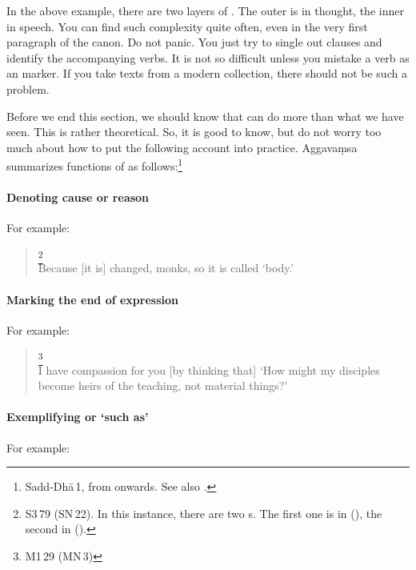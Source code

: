 In the above example, there are two layers of . The outer is in thought, the inner in speech. You can find such complexity quite often, even in the very first paragraph of the canon. Do not panic. You just try to single out  clauses and identify the accompanying verbs. It is not so difficult unless you mistake a verb as an  marker. If you take texts from a modern collection, there should not be such a problem.

Before we end this section, we should know that  can do more than what we have seen. This is rather theoretical. So, it is good to know, but do not worry too much about how to put the following account into practice. Aggava\d msa summarizes functions of  as follows:\footnote{Sadd-Dh\=a\,1, from  onwards. See also \citealp[p.~142]{collins:grammar}.}

\paragraph*{Denoting cause or reason}\label{par:iti} For example:

\begin{quote}
\footnote{S3\,79 (SN\,22). In this instance, there are two s. The first one is in  (), the second in  ().}\\
Because [it is] changed, monks, so it is called `body.'\\
\end{quote}

\paragraph*{Marking the end of expression} For example:

\begin{quote}
\footnote{M1\,29 (MN\,3)}\\
I have compassion for you [by thinking that] `How might my disciples become heirs of the teaching, not material things?'\\
\end{quote}

\paragraph*{Exemplifying or `such as'} For example:

